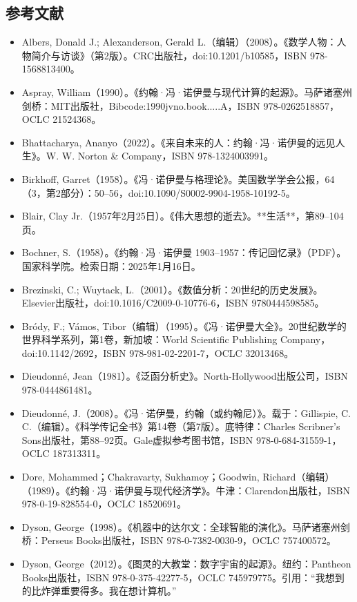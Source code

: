 \subsection{参考文献}
\begin{itemize}
\item Albers, Donald J.; Alexanderson, Gerald L.（编辑）（2008）。《数学人物：人物简介与访谈》（第2版）。CRC出版社，doi:10.1201/b10585，ISBN 978-1568813400。  
\item Aspray, William（1990）。《约翰·冯·诺伊曼与现代计算的起源》。马萨诸塞州剑桥：MIT出版社，Bibcode:1990jvno.book.....A，ISBN 978-0262518857，OCLC 21524368。  
\item Bhattacharya, Ananyo（2022）。《来自未来的人：约翰·冯·诺伊曼的远见人生》。W. W. Norton & Company，ISBN 978-1324003991。  
\item Birkhoff, Garret（1958）。《冯·诺伊曼与格理论》。美国数学学会公报，64（3，第2部分）：50–56，doi:10.1090/S0002-9904-1958-10192-5。  
\item Blair, Clay Jr.（1957年2月25日）。《伟大思想的逝去》。**生活**，第89–104页。  
\item Bochner, S.（1958）。《约翰·冯·诺伊曼 1903–1957：传记回忆录》（PDF）。国家科学院。检索日期：2025年1月16日。  
\item Brezinski, C.; Wuytack, L.（2001）。《数值分析：20世纪的历史发展》。Elsevier出版社，doi:10.1016/C2009-0-10776-6，ISBN 9780444598585。  
\item Bródy, F.; Vámos, Tibor（编辑）（1995）。《冯·诺伊曼大全》。20世纪数学的世界科学系列，第1卷，新加坡：World Scientific Publishing Company，doi:10.1142/2692，ISBN 978-981-02-2201-7，OCLC 32013468。
\item Dieudonné, Jean（1981）。《泛函分析史》。North-Hollywood出版公司，ISBN 978-0444861481。  
\item Dieudonné, J.（2008）。《冯·诺伊曼，约翰（或约翰尼）》。载于：Gillispie, C. C.（编辑）。《科学传记全书》第14卷（第7版）。底特律：Charles Scribner's Sons出版社，第88–92页。Gale虚拟参考图书馆，ISBN 978-0-684-31559-1，OCLC 187313311。  
\item Dore, Mohammed；Chakravarty, Sukhamoy；Goodwin, Richard（编辑）（1989）。《约翰·冯·诺伊曼与现代经济学》。牛津：Clarendon出版社，ISBN 978-0-19-828554-0，OCLC 18520691。  
\item Dyson, George（1998）。《机器中的达尔文：全球智能的演化》。马萨诸塞州剑桥：Perseus Books出版社，ISBN 978-0-7382-0030-9，OCLC 757400572。  
\item Dyson, George（2012）。《图灵的大教堂：数字宇宙的起源》。纽约：Pantheon Books出版社，ISBN 978-0-375-42277-5，OCLC 745979775。引用：“我想到的比炸弹重要得多。我在想计算机。”  

\end{itemize}
